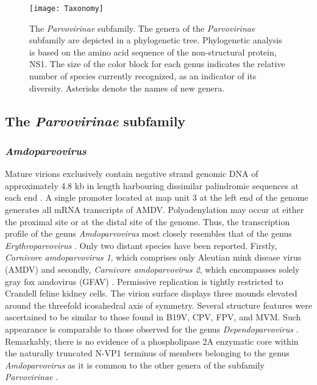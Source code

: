 
\begin{figure}[h]
\centering
\texttt{[image: Taxonomy]}
\caption[The \textit{Parvovirinae} subfamily]{The \textit{Parvovirinae} subfamily. The genera of the \textit{Parvovirinae} subfamily are depicted in a phylogenetic tree. Phylogenetic analysis is based on the amino acid sequence of the non-structural protein, NS1. The size of the color block for each genus indicates the relative number of species currently recognized, as an indicator of its diversity. Asterisks denote the names of new genera.} 
\label{Fig: Taxonomy}
\end{figure}



\subsection{The \textit{Parvovirinae} subfamily}
\label{sec: The Parvovirinae subfamily}   


\subsubsection{\textit{Amdoparvovirus}}

Mature virions exclusively contain negative strand genomic DNA of approximately 4.8 kb in length harbouring dissimilar palindromic sequences at each end \cite{pmid6252342, pmid2843669}. A single promoter located at map unit 3 at the left end of the genome generates all mRNA transcripts of AMDV. Polyadenylation may occur at either the proximal site or at the distal site of the genome. Thus, the transcription profile of the genus \textit{Amdoparvovirus} most closely resembles  that of the genus \textit{Erythroparvovirus} \cite{pmid16378968}.  
Only two distant species have been reported. Firstly, \textit{Carnivore amdoparvovirus 1}, which comprises only Aleutian mink disease virus (AMDV) and secondly, \textit{Carnivore amdoparvovirus 2}, which encompasses solely gray fox amdovirus (GFAV) \cite{pmid22000359}. 
Permissive replication is tightly restricted to Crandell feline kidney cells. The virion surface displays three mounds elevated around the threefold icosahedral axis of symmetry. Several structure features were ascertained to be similar to those found in B19V, CPV, FPV, and MVM. Such appearance is comparable to those observed for the genus \textit{Dependoparvovirus} \cite{pmid10400786}. Remarkably, there is no evidence of a phospholipase 2A enzymatic core within the naturally truncated N-VP1 terminus of members belonging to the genus \textit{Amdoparvovirus} as it is common to the other genera of the subfamily \textit{Parvovirinae} \cite{icvt}. 


